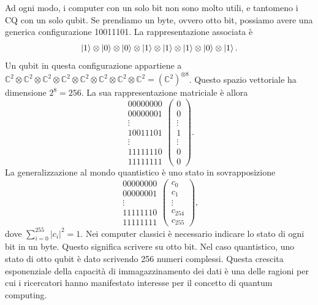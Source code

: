 Ad ogni modo, i computer con un solo bit non sono molto utili, e tantomeno i \ac{CQ} con 
un solo qubit. Se prendiamo un byte, ovvero otto bit, possiamo avere una generica 
configurazione 10011101. La rappresentazione associata è 
\begin{equation}
    \ket{1}\otimes\ket{0}\otimes\ket{0}\otimes\ket{1}\otimes\ket{1}\otimes\ket{1}\otimes\ket{0}\otimes\ket{1}.
\end{equation}
Un qubit in questa configurazione appartiene a $\mathbb{C}^2\otimes\mathbb{C}^2\otimes\mathbb{C}^2\otimes\mathbb{C}^2\otimes\mathbb{C}^2\otimes\mathbb{C}^2\otimes\mathbb{C}^2\otimes\mathbb{C}^2 = (\mathbb{C}^2)^{\otimes 8}$. 
Questo spazio vettoriale ha dimensione $2^8=256$. La sua rappresentazione matriciale è allora
\begin{equation}
    \begin{matrix}
        00000000 \\ 
        00000001 \\ 
        \vdots \\ 
        10011101 \\
        \vdots \\
        11111110 \\ 
        11111111
    \end{matrix}
    \begin{pmatrix}
        0 \\ 0 \\ \vdots \\ 1 \\ \vdots \\ 0 \\ 0
    \end{pmatrix}
    .
\end{equation}
La generalizzazione al mondo quantistico è uno stato in sovrapposizione 
\begin{equation}
    \begin{matrix}
        00000000 \\ 
        00000001 \\ 
        \vdots \\
        11111110 \\ 
        11111111
    \end{matrix}
    \begin{pmatrix}
        c_0 \\ c_1 \\ \vdots \\ c_{254} \\ c_{255}
    \end{pmatrix},
\end{equation}
dove $\sum_{i=0}^{255}|c_i|^2=1$. 
Nei computer classici è necessario indicare lo stato di ogni bit in un byte. 
Questo significa scrivere su otto bit. Nel caso quantistico, uno stato di otto 
qubit è dato scrivendo 256 numeri complessi. Questa crescita esponenziale della 
capacità di immagazzinamento dei dati è una delle ragioni per cui i ricercatori 
hanno manifestato interesse per il concetto di quantum computing. 

